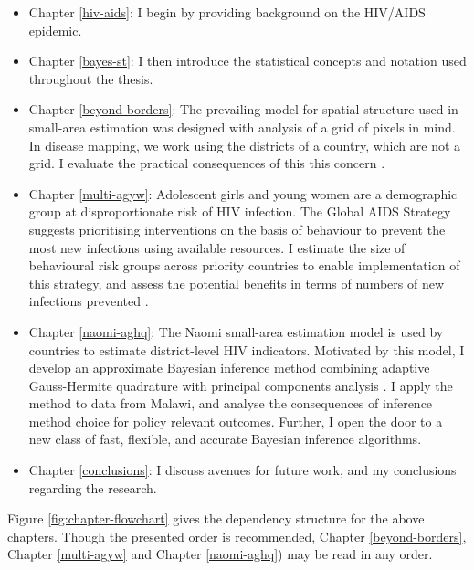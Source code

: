 \documentclass[a4paper, nobind]{templates/ociamthesis}
\providecommand{\tightlist}{%
  \setlength{\itemsep}{0pt}\setlength{\parskip}{0pt}}
\begin{document}
\begin{itemize}
\tightlist
\item
  Chapter \ref{hiv-aids}: I begin by providing background on the HIV/AIDS epidemic.
\item
  Chapter \ref{bayes-st}: I then introduce the statistical concepts and notation used throughout the thesis.
\item
  Chapter \ref{beyond-borders}: The prevailing model for spatial structure used in small-area estimation \autocite{besag1991bayesian} was designed with analysis of a grid of pixels in mind.
  In disease mapping, we work using the districts of a country, which are not a grid.
  I evaluate the practical consequences of this this concern \autocite{howes2023beyond}.
\item
  Chapter \ref{multi-agyw}: Adolescent girls and young women are a demographic group at disproportionate risk of HIV infection.
  The Global AIDS Strategy suggests prioritising interventions on the basis of behaviour to prevent the most new infections using available resources.
  I estimate the size of behavioural risk groups across priority countries to enable implementation of this strategy, and assess the potential benefits in terms of numbers of new infections prevented \autocite{howes2023spatio}.
\item
  Chapter \ref{naomi-aghq}: The Naomi small-area estimation model \autocite{eaton2021naomi} is used by countries to estimate district-level HIV indicators.
  Motivated by this model, I develop an approximate Bayesian inference method combining adaptive Gauss-Hermite quadrature with principal components analysis \autocite{howes2023fast}.
  I apply the method to data from Malawi, and analyse the consequences of inference method choice for policy relevant outcomes.
  Further, I open the door to a new class of fast, flexible, and accurate Bayesian inference algorithms.
\item
  Chapter \ref{conclusions}: I discuss avenues for future work, and my conclusions regarding the research.
\end{itemize}

Figure \ref{fig:chapter-flowchart} gives the dependency structure for the above chapters.
Though the presented order is recommended, Chapter \ref{beyond-borders}, Chapter \ref{multi-agyw} and Chapter \ref{naomi-aghq}) may be read in any order.
\end{document}
